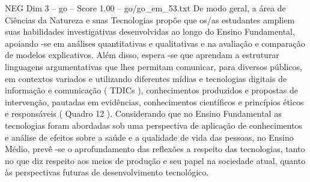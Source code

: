 \begin{textsample}{NEG Dim 3 – go – Score 1.00 – go/go\_em\_53.txt}
De modo geral, a área de Ciências da Natureza e suas Tecnologias propõe que os/as estudantes ampliem suas habilidades investigativas desenvolvidas ao longo do Ensino Fundamental, apoiando -se em análises quantitativas e qualitativas e na avaliação e comparação de modelos explicativos.
Além disso, espera -se que aprendam a estruturar linguagens argumentativas que lhes permitam comunicar, para diversos públicos, em contextos variados e utilizando diferentes mídias e tecnologias digitais de informação e comunicação ( TDICs ), conhecimentos produzidos e propostas de intervenção, pautadas em evidências, conhecimentos científicos e princípios éticos e responsáveis ( Quadro 12 ).
Considerando que no Ensino Fundamental as tecnologias foram abordadas sob uma perspectiva de aplicação de conhecimentos e análise de efeitos sobre a saúde e a qualidade de vida das pessoas, no Ensino Médio, prevê -se o aprofundamento das reflexões a respeito das tecnologias, tanto no que diz respeito aos meios de produção e seu papel na sociedade atual, quanto às perspectivas futuras de desenvolvimento tecnológico.

\end{textsample}
